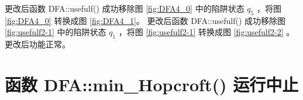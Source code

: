 更改后函数 DFA::usefulf() 成功移除图 \ref{fig:DFA4_0} 中的陷阱状态 $q_5$ ，将图 \ref{fig:DFA4_0} 转换成图 \ref{fig:DFA4_1}。
更改后函数 DFA::usefulf() 成功移除图 \ref{fig:usefulf2-1} 中的陷阱状态 $q_1$ ，将图 \ref{fig:usefulf2-1} 转换成图 \ref{fig:usefulf2-2} 。
更改后功能正常。



\section{函数 DFA::min\_Hopcroft() 运行中止}\label{sec:hopcroft}

